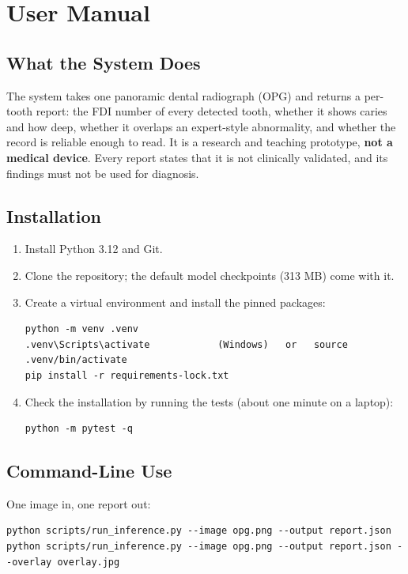 \chapter{User Manual}
\label{app:manual}

\section{What the System Does}

The system takes one panoramic dental radiograph (OPG) and returns a per-tooth report: the FDI number
of every detected tooth, whether it shows caries and how deep, whether it overlaps an expert-style
abnormality, and whether the record is reliable enough to read. It is a research and teaching
prototype, \textbf{not a medical device}. Every report states that it is not clinically validated, and
its findings must not be used for diagnosis.

\section{Installation}

\begin{enumerate}[label=\arabic*.,leftmargin=1.6em]
\item Install Python 3.12 and Git.
\item Clone the repository; the default model checkpoints (313 MB) come with it.
\item Create a virtual environment and install the pinned packages:
\begin{lstlisting}
python -m venv .venv
.venv\Scripts\activate            (Windows)   or   source .venv/bin/activate
pip install -r requirements-lock.txt
\end{lstlisting}
\item Check the installation by running the tests (about one minute on a laptop):
\begin{lstlisting}
python -m pytest -q
\end{lstlisting}
\end{enumerate}

\section{Command-Line Use}

One image in, one report out:
\begin{lstlisting}
python scripts/run_inference.py --image opg.png --output report.json
python scripts/run_inference.py --image opg.png --output report.json --overlay overlay.jpg
\end{lstlisting}

